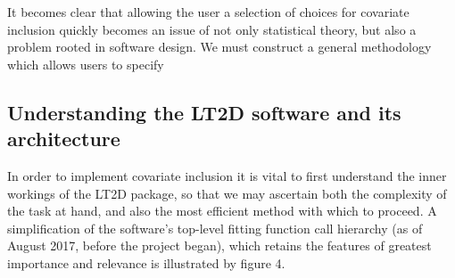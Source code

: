 \documentclass[11pt]{article}
\begin{document}
\begin{multicols}{2}
It becomes clear that allowing the user a selection of choices for covariate inclusion quickly becomes an issue of not only statistical theory, but also a problem rooted in software design. We must construct a general methodology which allows users to specify

\subsection{Understanding the LT2D software and its architecture}
In order to implement covariate inclusion it is vital to first understand the inner workings of the LT2D package, so that we may ascertain both the complexity of the task at hand, and also the most efficient method with which to proceed. A simplification of the software's top-level fitting function call hierarchy (as of August 2017, before the project began), which retains the features of greatest importance and relevance is illustrated by figure 4.


\end{multicols}
\end{document}

